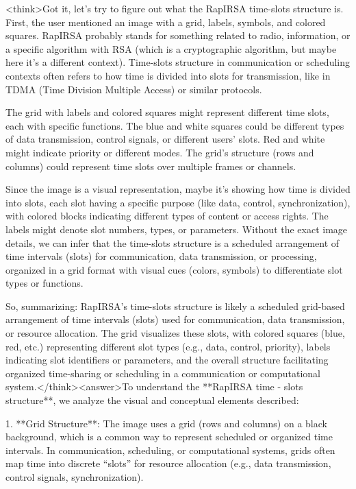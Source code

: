 <think>Got it, let's try to figure out what the RapIRSA time-slots structure is. First, the user mentioned an image with a grid, labels, symbols, and colored squares. RapIRSA probably stands for something related to radio, information, or a specific algorithm with RSA (which is a cryptographic algorithm, but maybe here it's a different context). Time-slots structure in communication or scheduling contexts often refers to how time is divided into slots for transmission, like in TDMA (Time Division Multiple Access) or similar protocols.

The grid with labels and colored squares might represent different time slots, each with specific functions. The blue and white squares could be different types of data transmission, control signals, or different users' slots. Red and white might indicate priority or different modes. The grid's structure (rows and columns) could represent time slots over multiple frames or channels.

Since the image is a visual representation, maybe it's showing how time is divided into slots, each slot having a specific purpose (like data, control, synchronization), with colored blocks indicating different types of content or access rights. The labels might denote slot numbers, types, or parameters. Without the exact image details, we can infer that the time-slots structure is a scheduled arrangement of time intervals (slots) for communication, data transmission, or processing, organized in a grid format with visual cues (colors, symbols) to differentiate slot types or functions.

So, summarizing: RapIRSA's time-slots structure is likely a scheduled grid-based arrangement of time intervals (slots) used for communication, data transmission, or resource allocation. The grid visualizes these slots, with colored squares (blue, red, etc.) representing different slot types (e.g., data, control, priority), labels indicating slot identifiers or parameters, and the overall structure facilitating organized time-sharing or scheduling in a communication or computational system.</think><answer>To understand the **RapIRSA time - slots structure**, we analyze the visual and conceptual elements described:  

1. **Grid Structure**: The image uses a grid (rows and columns) on a black background, which is a common way to represent scheduled or organized time intervals. In communication, scheduling, or computational systems, grids often map time into discrete “slots” for resource allocation (e.g., data transmission, control signals, synchronization).  

